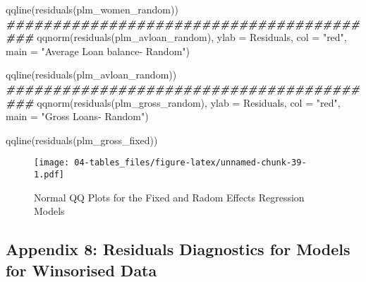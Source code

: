 \documentclass[a4paper,nobind]{templates/ociamthesis}
\newenvironment{Shaded}{\begin{snugshade}}{\end{snugshade}}
\newcommand{\AttributeTok}[1]{\textcolor[rgb]{0.77,0.63,0.00}{#1}}
\newcommand{\DocumentationTok}[1]{\textcolor[rgb]{0.56,0.35,0.01}{\textbf{\textit{#1}}}}
\newcommand{\FunctionTok}[1]{\textcolor[rgb]{0.00,0.00,0.00}{#1}}
\newcommand{\NormalTok}[1]{#1}
\newcommand{\StringTok}[1]{\textcolor[rgb]{0.31,0.60,0.02}{#1}}
\renewenvironment{Shaded}
{
  \vspace{10pt}%
  \begin{snugshade}%
}{%
  \end{snugshade}%
  \vspace{8pt}%
}
\begin{document}
\begin{landscape}
\begin{Shaded}
\begin{Highlighting}[]
\FunctionTok{qqline}\NormalTok{(}\FunctionTok{residuals}\NormalTok{(plm\_women\_random))}
\DocumentationTok{\#\#\#\#\#\#\#\#\#\#\#\#\#\#\#\#\#\#\#\#\#\#\#\#\#\#\#\#\#\#\#\#\#\#\#\#\#\#\#\#\#}
\FunctionTok{qqnorm}\NormalTok{(}\FunctionTok{residuals}\NormalTok{(plm\_avloan\_random), }\AttributeTok{ylab =} \StringTok{\textquotesingle{}Residuals\textquotesingle{}}\NormalTok{, }\AttributeTok{col =} \StringTok{"red"}\NormalTok{, }
       \AttributeTok{main =} \StringTok{"Average Loan balance{-} Random"}\NormalTok{)}

\FunctionTok{qqline}\NormalTok{(}\FunctionTok{residuals}\NormalTok{(plm\_avloan\_random))}
\DocumentationTok{\#\#\#\#\#\#\#\#\#\#\#\#\#\#\#\#\#\#\#\#\#\#\#\#\#\#\#\#\#\#\#\#\#\#\#\#\#\#\#\#\#}
\FunctionTok{qqnorm}\NormalTok{(}\FunctionTok{residuals}\NormalTok{(plm\_gross\_random), }\AttributeTok{ylab =} \StringTok{\textquotesingle{}Residuals\textquotesingle{}}\NormalTok{, }\AttributeTok{col =} \StringTok{"red"}\NormalTok{, }
       \AttributeTok{main =} \StringTok{"Gross Loans{-} Random"}\NormalTok{)}

\FunctionTok{qqline}\NormalTok{(}\FunctionTok{residuals}\NormalTok{(plm\_gross\_fixed))}
\end{Highlighting}
\end{Shaded}

\begin{figure}
\centering
\texttt{[image: 04-tables\_files/figure-latex/unnamed-chunk-39-1.pdf]}
\caption{\label{fig:unnamed-chunk-39}Normal QQ Plots for the Fixed and Radom Effects Regression Models}
\end{figure}

\newpage

\hypertarget{appendix-8-residuals-diagnostics-for-models-for-winsorised-data}{%
\subsection{Appendix 8: Residuals Diagnostics for Models for Winsorised Data}\label{appendix-8-residuals-diagnostics-for-models-for-winsorised-data}}


\end{landscape}
\end{document}
